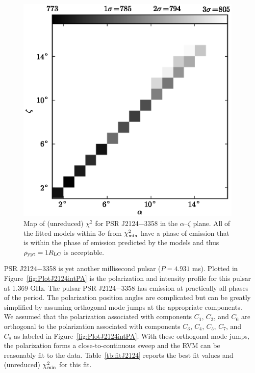\begin{figure}[t!!]
\begin{center}
\includegraphics[scale=.8]{chapters/applicationOfNumericalModel/figures/J2124-3358Map.eps}
\caption[Map of (unreduced) $\chi^{2}$ for PSR J2124$-$3358 in the $\alpha$--$\zeta$ plane]{\label{fig:MapJ2124}
Map of (unreduced) $\chi^{2}$ for PSR J2124$-$3358 in the $\alpha$--$\zeta$ plane.
All of the fitted models within $3\sigma$ from $\chi^2_{\rm{min}}$ have a phase of emission
that is within the phase of emission predicted by the models and thus $\rho_{\rm{ypt}}=1R_{\rm{LC}}$
is acceptable.
}
\end{center}
\end{figure}


PSR J2124$-$3358 is yet another millisecond pulsar ($P=4.931$ ms).  
Plotted in Figure~\ref{fig:PlotJ2124intPA}
is the polarization and intensity profile for this pulsar at 1.369 GHz.  
The pulsar PSR J2124$-$3358 has emission at practically 
all phases of the period.  The polarization position angles
are complicated but can be greatly simplified by assuming orthogonal mode jumps
at the appropriate components.  We assumed that the polarization associated with
components $C_1$, $C_2$, and $C_6$ are orthogonal to the polarization associated with
components $C_3$, $C_4$, $C_5$, $C_7$,  
and $C_8$ as labeled in Figure~\ref{fig:PlotJ2124intPA}.
With these orthogonal mode jumps, the polarization forms a close-to-continuous 
sweep and the RVM can be reasonably fit to the data.  Table~\ref{tb:fitJ2124} 
reports the best fit values and (unreduced) $\chi^2_{\rm{min}}$ for this fit.  

